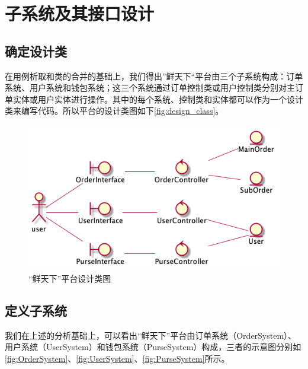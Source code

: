 \chapter{子系统及其接口设计}

\section{确定设计类}
    在用例析取和类的合并的基础上，我们得出”鲜天下“平台由三个子系统构成：订单系统、用户系统和钱包系统；这三个系统通过订单控制类或用户控制类分别对主订单实体或用户实体进行操作。其中的每个系统、控制类和实体都可以作为一个设计类来编写代码。所以平台的设计类图如下\autoref{fig:design_class}。

    \begin{figure}[htp]
        \centering
        \includegraphics[width=12cm]{report/figure/subsystem/design_class.png}
        \caption{“鲜天下”平台设计类图}
        \label{fig:design_class}
    \end{figure}

\section{定义子系统}
    我们在上述的分析基础上，可以看出“鲜天下”平台由订单系统（OrderSystem）、用户系统（UserSystem）和钱包系统（PurseSystem）构成，三者的示意图分别如\autoref{fig:OrderSystem}、\autoref{fig:UserSystem}、\autoref{fig:PurseSystem}所示。

